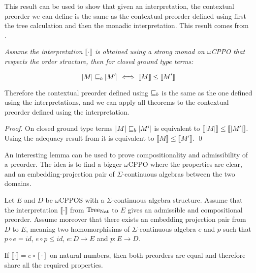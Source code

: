 This result can be used to show that given an interpretation,
the contextual preorder we can define is the same as 
the contextual preorder defined using first the tree
calculation and then the monadic interpretation. This 
result comes from \cite{plotkin2001adequacy}.

\begin{acorollary}
    \em
    Assume the interpretation $\llbracket \cdot \rrbracket$ 
    is obtained using a strong monad on $\omega$CPPO that 
    respects the order structure, then for closed ground 
    type terms:

    \begin{equation*}
        |M| \sqsubseteq_b |M'| \iff \llbracket M \rrbracket \leq \llbracket M' \rrbracket
    \end{equation*}

    Therefore the contextual preorder defined using $\sqsubseteq_b$
    is the same as the one defined using the interpretations, and 
    we can apply all theorems to the contextual preorder defined 
    using the interpretation.
\end{acorollary}

\begin{proof}
    On closed ground type terms $|M| \sqsubseteq_b |M'|$ is equivalent 
    to $\llbracket |M| \rrbracket \leq \llbracket |M'| \rrbracket$.
    Using the adequacy result from \cite{plotkin2001adequacy} 
    it is equivalent to $\llbracket M \rrbracket \leq \llbracket M' \rrbracket$.
\qed\end{proof}

An interesting lemma can be used to prove compositionality 
and admissibility of a preorder. The idea is to find a 
bigger $\omega$CPPO where the properties are clear, and 
an embedding-projection pair of $\Sigma$-continuous 
algebras between the two domains. 

\begin{alemma}
    Let $E$ and $D$ be $\omega$CPPOS with a $\Sigma$-continuous
    algebra structure. Assume that 
    the interpretation $\llbracket \cdot \rrbracket$ from $\textnormal{Tree}_{\textnormal{Nat}}$ to $E$
    gives an admissible and compositional preorder. 
    Assume moreover that there exists
    an embedding projection pair from $D$ to $E$,
    meaning two homomorphisims of $\Sigma$-continuous algebra 
    $e$ and $p$ such that $p \circ e = id$, $e \circ p \leq id$, 
    $e: D \to E$ and $p : E \to D$.

    If $\llbracket \cdot \rrbracket = e \circ [ \cdot ]$ on natural 
    numbers, then both preorders are equal and therefore share all 
    the required properties.
\end{alemma}

